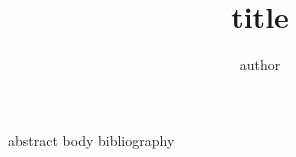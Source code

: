 \documentclass[11pt]{article}
\begin{document}
\title{{{title}}}
\author{{{author}}}
\maketitle
{{abstract}}
{{body}}
{{bibliography}}
\end{document}

